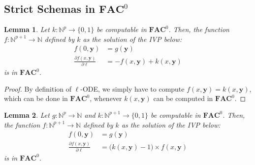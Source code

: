 \documentclass[11pt, oneside]{article}
\newenvironment{toappendix}{}{}
\newcommand{\Nat}{\mathbb{N}}
\newcommand{\AC}{\mathbf{FAC}}
\newcommand{\tu}[1]{\mathbf{#1}}
\newtheorem{lemma}{Lemma}
\theoremstyle{definition}
\begin{document}
\begin{toappendix}
%
\subsection{Strict Schemas in $\AC^0$}\label{appendix:AC0}





\begin{lemma}
    Let $k: \Nat^{p} \to \{0, 1\}$ be computable in $\AC^0$. 
    Then, the function $f: \Nat^{p+1} \to \Nat$ defined by $k$ as the solution of the IVP below:
        \begin{align*}
        f(0, \tu y) &= g(\tu y) \\
        \frac{\partial f(x, \tu y)}{\partial \ell} &= - f(x, \tu y) + k(x, \tu y)
        \end{align*}
    is in $\AC^0$.
\end{lemma}
\begin{proof}
    By definition of $\ell$-ODE, we simply have to compute $f(x, \tu y) = k(x, \tu y)$, which can be done in $\AC^0$, whenever $k(x, \tu y)$ can be computed in $\AC^0$.
\end{proof}



\begin{lemma}\label{lemma:ODEzero}
Let $g:\Nat^p \to \Nat$ and $k:\Nat^{p+1}\to \{0,1\}$ be computable in $\AC^0$.
Then, the function $f:\Nat^{p+1}\to \Nat$ defined by $k$ as the solution of the IVP below:
    \begin{align*}
        f(0, \tu y) &= g(\tu y) \\
        \frac{\partial f(x, \tu y)}{\partial \ell} &= \big(k(x, \tu y) -1\big) \times f(x, \tu y)
    \end{align*}
is in $\AC^0$.
\end{lemma}



\end{toappendix}
\end{document}
